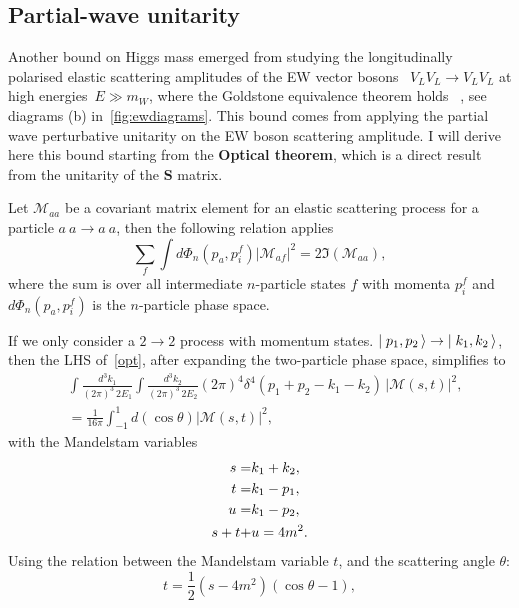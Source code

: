 \subsection{Partial-wave unitarity \label{pwusection}}
Another bound on Higgs mass emerged from studying the longitudinally polarised elastic scattering amplitudes of the EW vector bosons ~$V_L V_L \to V_L V_L$ at high energies~$ E \gg m_W$, where the Goldstone equivalence theorem holds ~\cite{PhysRevD.42.853}, see diagrams (b) in~\autoref{fig:ewdiagrams}. 
This bound comes from applying the partial wave perturbative unitarity on the EW boson scattering amplitude. I will derive here this bound starting from the \textbf{Optical theorem}, which is a direct result from the unitarity of the $\mathbf S$ matrix.
\begin{tcolorbox}[title=The optical theorem,
	title filled=false,
	colback=Mahogany!5!white,
	colframe=Mahogany]
	Let $\mathcal M_{aa}$ be a covariant matrix element for an elastic  scattering process  for a particle $a \ a \to a \ a$, then the following relation applies
	\begin{equation}
		\sum_{f}  \int d\Phi_n(p_a,p_i^f)| \mathcal M_{af}|^2 = 2 \mathfrak{I}( \mathcal M_{aa}),
		\label{opt}
	\end{equation}
	where the sum is over all intermediate $n$-particle states $f$ with momenta $p_i^f$ and $d\Phi_n(p_a,p_i^f)$ is the $n$-particle phase space.
\end{tcolorbox}
If we only consider a $2 \to 2$ process with momentum states. $\mbox{$\mid p_1,p_2\,\rangle$} \to \mbox{$\mid k_1,k_2\,\rangle$}$, then the LHS of~\eqref{opt}, after expanding the two-particle phase space, simplifies to 
\begin{align}
	&\int  \frac{d^3k_1}{(2 \pi)^3\,2E_1} \int  \frac{d^3k_2}{(2 \pi)^3\,2E_2} (2 \pi)^4 \delta^4(p_1+p_2-k_1-k_2)\,| \mathcal M (s,t)|^2 ,\nonumber \\
	&= \frac{1}{16 \pi} \int_{-1}^{1} d(\cos \theta) | \mathcal M (s,t)|^2,
\end{align}
with the Mandelstam variables 
\begin{align}
	s = &k_1+k_2, \nonumber \\
	t =& k_1-p_1, \nonumber \\
	u=& k_1-p_2, \\
	s+t+&u = 4 m^2 . \nonumber
\end{align}
Using the relation between the Mandelstam variable $t$, and the scattering angle $\theta$:
\begin{equation}
	t = \frac{1}{2} (s-4 m^2)(\cos \theta-1),
\end{equation}
